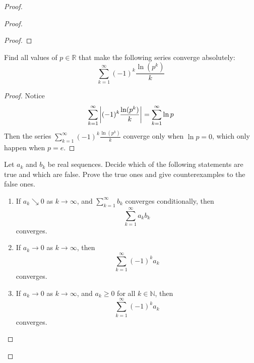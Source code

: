 \documentclass{report}
\begin{document}
\begin{proof}
\begin{proof}
\begin{proof}
\end{proof}

\begin{question}{}{}
Find all values of \( p \in \mathbb{R} \) that make the following series converge absolutely:
\[
\sum_{k=1}^{\infty} (-1)^k \frac{\ln(p^k)}{k}
\]
\end{question}
\begin{proof}
Notice 
\begin{equation}
  \sum_{k=1}^\infty \left|(-1)^k \frac{\ln (p^k)}{k}\right|=\sum_{k=1}^\infty \ln p
\end{equation}
Then the series $\sum_{k=1}^\infty (-1)^k \frac{\ln (p^k)}{k}$ converge only when $\ln p=0$, which only happen when $p=e$. 
\end{proof}

\begin{question}{}{}
Let \( a_k \) and \( b_k \) be real sequences. Decide which of the following statements are true and which are false. Prove the true ones and give counterexamples to the false ones.

\begin{enumerate}
    \item If \( a_k \searrow 0 \) as \( k \to \infty \), and  $\sum_{k=1}^{\infty} b_k$ converges conditionally, then 
    \[
    \sum_{k=1}^{\infty} a_kb_k
    \]
    converges.
    
    \item If \( a_k \to 0 \) as \( k \to \infty \), then 
    \[
    \sum_{k=1}^{\infty} (-1)^k a_k
    \]
    converges.
    
    \item If \( a_k \to 0 \) as \( k \to \infty \), and \( a_k \geq 0 \) for all \( k \in \mathbb{N} \), then 
    \[
    \sum_{k=1}^{\infty} (-1)^k a_k
    \]
    converges.
    

\end{enumerate}
\end{question}
\end{proof}
\end{proof}
\end{document}
